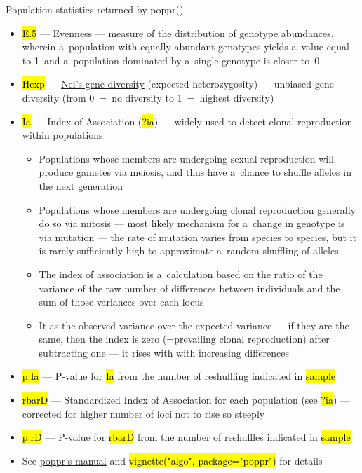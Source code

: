 \documentclass[compress, ucs, xelatex, 11pt, xcolor=svgnames,
	hyperref={
		bookmarks=true,
		unicode=true,
		colorlinks=true,
		pdftitle={Molecular data in R},
		plainpages=false,
		pdfauthor={Vojtech Zeisek},
		pdfsubject={Course about phylogeny and evolution in R},
		pdfcreator={XeLaTeX},
		pdfkeywords={R, evolution, phylogeny, molecular data},
		linkcolor=Tomato,
		anchorcolor=SaddleBrown,
		citecolor=Goldenrod,
		filecolor=DarkMagenta,
		menucolor=Sienna,
		urlcolor=DarkTurquoise,
		pdftex},
	url={hyphens, lowtilde} %
	]{beamer}
\renewcommand{\texttt}[1]{\hl{\ttfamily #1}}
\begin{document}
\begin{frame}[allowframebreaks]{Population statistics returned by poppr()}
\begin{itemize}
		\item \texttt{E.5} --- Evenness --- measure of the distribution of genotype abundances, wherein a~population with equally abundant genotypes yields a~value equal to 1~and a~population dominated by a~single genotype is closer to~0
		\item \texttt{Hexp} --- \href{http://www.genetics.org/content/89/3/583}{Nei's gene diversity} (expected heterozygosity) --- unbiased gene diversity (from 0~=~no diversity to 1~=~highest diversity)
		\item \texttt{Ia} --- Index of Association (\texttt{?ia}) --- widely used to detect clonal reproduction within populations
		\begin{itemize}
			\item Populations whose members are undergoing sexual reproduction will produce gametes via meiosis, and thus have a~chance to shuffle alleles in the next generation
			\item Populations whose members are undergoing clonal reproduction generally do so via mitosis --- most likely mechanism for a~change in genotype is via mutation --- the rate of mutation varies from species to species, but it is rarely sufficiently high to approximate a~random shuffling of alleles
			\item The index of association is a~calculation based on the ratio of the variance of the raw number of differences between individuals and the sum of those variances over each locus
			\item It as the observed variance over the expected variance --- if they are the same, then the index is zero (=prevailing clonal reproduction) after subtracting one --- it rises with with increasing differences
		\end{itemize}
		\item \texttt{p.Ia} --- P-value for \texttt{Ia} from the number of reshuffling indicated in \texttt{sample}
		\item \texttt{rbarD} --- Standardized Index of Association for each population (see \texttt{?ia}) --- corrected for higher number of loci not to rise so steeply
		\item \texttt{p.rD} --- P-value for \texttt{rbarD} from the number of reshuffles indicated in \texttt{sample}
		\item See \href{https://grunwaldlab.github.io/Population_Genetics_in_R/}{poppr's manual} and \texttt{vignette("algo", package="poppr")} for details
	\end{itemize}
\end{frame}
\end{document}
